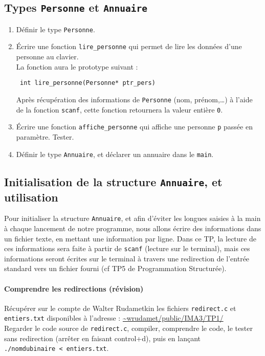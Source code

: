 \documentclass[final, pdftex, a4paper, openbib, ]{article}
\begin{document}
\subsection{Types \texttt{Personne} et \texttt{Annuaire}}
\begin{enumerate}
	\item Définir le type \texttt{Personne}.
	\item Écrire une fonction \texttt{lire\_personne} qui permet de lire les données d’une personne au clavier.\\
	La fonction aura le prototype suivant :\\
	\centerline{\texttt{ int lire\_personne(Personne* ptr\_pers)}\\}
	Après récupération des informations de \texttt{Personne} (nom, prénom,\ldots) à l’aide de la fonction \texttt{scanf}, cette fonction retournera la valeur entière \texttt{0}.
	\item Écrire une fonction \texttt{affiche\_personne} qui affiche une personne \texttt{p} passée en paramètre.
	Tester.
	\item Définir le type \texttt{Annuaire}, et déclarer un annuaire dans le \texttt{main}.
\end{enumerate}


\subsection{Initialisation de la structure \texttt{Annuaire}, et utilisation}
Pour initialiser la structure \texttt{Annuaire}, et afin d’éviter les longues saisies à la main à chaque lancement de notre programme, nous allons écrire des informations dans un fichier texte, en mettant une information par ligne. Dans ce TP, la lecture de ces informations sera faite à partir de \texttt{scanf} (lecture sur le terminal), mais ces informations seront écrites sur le terminal à travers une redirection de l’entrée standard vers un fichier fourni (cf TP5 de Programmation Structurée).

\paragraph{Comprendre les redirections (révision)}
Récupérer sur le compte de Walter Rudametkin les fichiers \texttt{redirect.c} et \texttt{entiers.txt} disponibles à l’adresse : \url{~wrudamet/public/IMA3/TP1/}\\
Regarder le code source de \texttt{redirect.c}, compiler, comprendre le code, le tester sans redirection (arrêter en faisant control+d), puis en lançant \texttt{./nomdubinaire~<~entiers.txt}.
\end{document}
